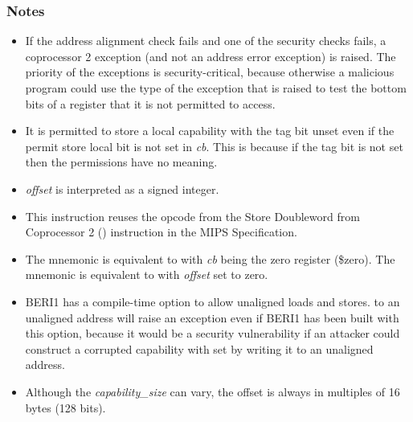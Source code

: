 \subsubsection*{Notes}

\begin{itemize}
\item
If the address alignment check fails and one of the security checks fails,
a coprocessor 2 exception (and not an address error exception) is raised.
The priority of the exceptions is security-critical, because otherwise a
malicious program could use the type of the exception that is raised to
test the bottom bits of a register that it is not permitted to access.
\item
It is permitted to store a local capability with the tag bit unset even if the permit store local bit is not set in \emph{cb}.
This is because if the tag bit is not set then the permissions have no meaning.
\item
\emph{offset} is interpreted as a signed integer.
\item
This instruction reuses the opcode from the Store Doubleword from Coprocessor 2
() instruction in the MIPS Specification.
\item
The  mnemonic is equivalent to  with
\emph{cb} being the zero register (\$zero). The  mnemonic
is equivalent to  with \emph{offset} set to zero.
\item
BERI1 has a compile-time option to allow unaligned loads and stores.
 to an unaligned address will raise an exception even if
BERI1 has been built with this option, because it would be a security
vulnerability if an attacker could construct a corrupted capability with
\ctag{} set by writing it to an unaligned address.
\item
Although the \emph{capability\_size} can vary, the offset is always in
multiples of 16 bytes (128 bits).
\end{itemize}
